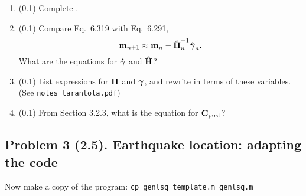 \documentclass[11pt,titlepage,fleqn]{article}
\begin{document}
\begin{enumerate}
\begin{enumerate}
\vspace{1cm}

\item (0.1) Complete .

\item (0.1) Compare Eq.~6.319 with Eq.~6.291,
%
\begin{equation}
\mbox{${\bf m}$}_{n+1} \approx \mbox{${\bf m}$}_{n} - \mbox{\boldmath{$\hat{\rm H}$}}^{-1}_n \mbox{\boldmath{$\hat{\gamma}$}}_n.
\label{mn}
\end{equation}
%
What are the equations for $\mbox{\boldmath{$\hat{\gamma}$}}$ and $\mbox{\boldmath{$\hat{\rm H}$}}$?

\vspace{1cm}

\item (0.1) List expressions for $\mbox{${\bf H}$}$ and $\mbox{\boldmath $\bf \gamma$}$, and rewrite  in terms of these variables. (See \verb+notes_tarantola.pdf+)

\vspace{1cm}

\item (0.1) From Section 3.2.3, what is the equation for $\mbox{${\bf C}$}_{\rm post}$?

\end{enumerate}

\end{enumerate}


\clearpage\pagebreak
\subsection*{Problem 3 (2.5). Earthquake location: adapting the code}

Now make a copy of the program: \verb+cp genlsq_template.m genlsq.m+
\end{document}
